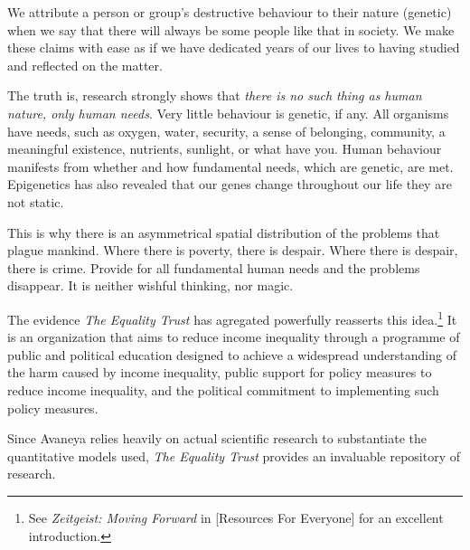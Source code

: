 

We attribute a person or group's destructive behaviour to their nature (genetic) when we say that there will always be some people like that in society. We make these claims with ease as if we have dedicated years of our lives to having studied and reflected on the matter.

The truth is, research strongly shows that {\it there is no such thing as human nature, only human needs}. Very little behaviour is genetic, if any. All organisms have needs, such as oxygen, water, security, a sense of belonging, community, a meaningful existence, nutrients, sunlight, or what have you. Human behaviour manifests from whether and how fundamental needs, which are genetic, are met. Epigenetics has also revealed that our genes change throughout our life they are not static.

This is why there is an asymmetrical spatial distribution of the problems that plague mankind. Where there is poverty, there is despair. Where there is despair, there is crime. Provide for all fundamental human needs and the problems disappear. It is neither wishful thinking, nor magic.

The evidence {\it The Equality Trust} has agregated powerfully reasserts this idea.\footnote{See {\it Zeitgeist: Moving Forward} in [Resources For Everyone] for an excellent introduction.} It is an organization that aims to reduce income inequality through a programme of public and political education designed to achieve a widespread understanding of the harm caused by income inequality, public support for policy measures to reduce income inequality, and the political commitment to implementing such policy measures. 

Since Avaneya relies heavily on actual scientific research to substantiate the quantitative models used, {\it The Equality Trust} provides an invaluable repository of research.




